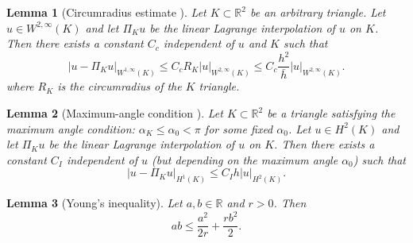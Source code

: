 \documentclass{article}
\newtheorem{lemma}{Lemma}
\theoremstyle{remark}
\def \IR {\mathbb{R}}
\def\WIi{W^{1,\infty}}
\def\WIIi{W^{2,\infty}}
\def\width{\bar{h}}
\begin{document}
\begin{lemma}[Circumradius estimate \cite{kobayashi2015circumradius}]
\label{lem:circum}
Let $K\subset\IR^2$ be an arbitrary triangle. Let $u\in \WIIi(K)$ and let $\Pi_K u$ be the linear Lagrange interpolation of $u$ on $K$. Then there exists a constant $C_c$ independent  of $u$ and $K$ such that
\begin{equation}
|u-\Pi_K u|_{\WIi(K)}\leq C_c R_K|u|_{\WIIi(K)} \leq C_c \frac{h^2}{\width}|u|_{\WIIi(K)}.
\label{lem:circum:est}
\end{equation}
where $R_K$ is the circumradius of the $K$ triangle.
\end{lemma}

\begin{lemma}[Maximum-angle condition \cite{babuvska1976angle}]
\label{lem:Max_angle_cond}
Let $K\subset\IR^2$ be a triangle satisfying the maximum angle condition: $\alpha_K\leq\alpha_0<\pi$ for some fixed $\alpha_0$. Let $u\in H^2(K)$ and let $\Pi_K u$ be the linear Lagrange interpolation of $u$ on $K$. Then there exists a constant $C_I$ independent of $u$ (but depending on the maximum angle $\alpha_0$) such that
\begin{equation}
|u-\Pi_K u|_{H^1(K)}\leq C_I h|u|_{H^2(K)}.
\label{lem:Max_angle_cond:est}
\end{equation}
\end{lemma}
\begin{lemma}[Young's inequality]
\label{lem:Young} Let $a,b\in\IR$ and $r>0$. Then
\begin{equation}
\label{eq:Young}
ab\leq \frac{a^2}{2r}+\frac{rb^2}{2}.
\end{equation}
\end{lemma}
\end{document}
